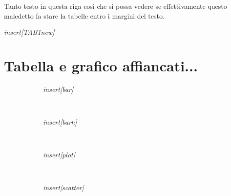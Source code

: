 \documentclass[a4paper, 10pt]{article}
\newcommand{\SRE}[1]{\textit{insert[#1]}}
\begin{document}
Tanto testo in questa riga così che si possa vedere se effettivamente questo maledetto fa stare la tabelle entro i margini del testo.

\tabulinesep=1.5mm

\SRE{TAB1new}

\section*{Tabella e grafico affiancati...}
\begin{figure}[h!]
  \begin{subfigure}[cm]{0.5\linewidth}
    \SRE{bar}
  \end{subfigure}
  ~
  \begin{subfigure}[cm]{0.5\linewidth}    
      \SRE{barh}
  \end{subfigure}
  \\
  \begin{subfigure}[cm]{0.5\linewidth}    
      \SRE{plot}
  \end{subfigure}
  ~ %
  \begin{subfigure}[cm]{0.5\linewidth}    
      \SRE{scatter}
  \end{subfigure}
\end{figure}

\end{document}
